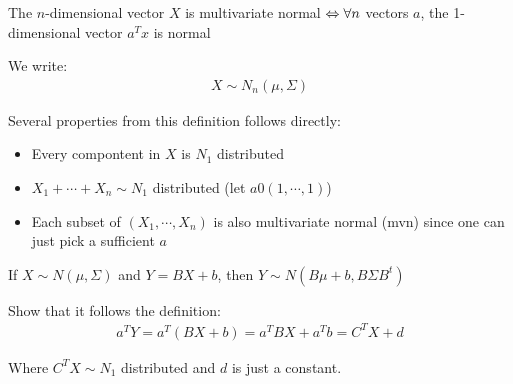 \par\bigskip
\begin{theo}[]{}
  The $n$-dimensional vector $X$ is multivariate normal $\Leftrightarrow\forall n$ vectors $a$, the 1-dimensional vector $a^Tx$ is normal
  \par\bigskip
  \noindent We write:
  \begin{equation*}
    \begin{gathered}
      X\sim N_n(\mu,\Sigma)
    \end{gathered}
  \end{equation*}
\end{theo}
\par\bigskip
\noindent Several properties from this definition follows directly:\par
\begin{itemize}
  \item Every compontent in $X$ is $N_1$ distributed
  \item $X_1+\cdots+X_n\sim N_1$ distributed (let $a 0 (1,\cdots,1)$)
  \item Each subset of $(X_1,\cdots,X_n)$ is also multivariate normal (mvn) since one can just pick a sufficient $a$
\end{itemize}
\par\bigskip
\begin{theo}[]{}
  If $X\sim N(\mu,\Sigma)$ and $Y = BX+b$, then $Y\sim N(B\mu+b,B\Sigma B^t)$
\end{theo}
\par\bigskip
\begin{prf}[]{}
  Show that it follows the definition:
  \begin{equation*}
    \begin{gathered}
      a^TY = a^T(BX+b) = a^TBX+a^Tb = C^TX+d
    \end{gathered}
  \end{equation*}
  \par\bigskip
  \noindent Where $C^TX\sim N_1$ distributed and $d$ is just a constant.
\end{prf}
